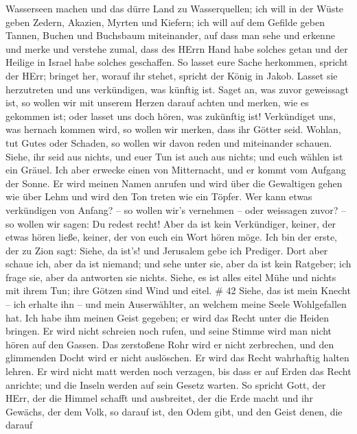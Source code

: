 Wasserseen machen und das dürre Land zu Wasserquellen;  ich
will in der Wüste geben Zedern, Akazien, Myrten und Kiefern; ich will
auf dem Gefilde geben Tannen, Buchen und Buchsbaum miteinander,
 auf dass man sehe und erkenne und merke und verstehe
zumal, dass des HErrn Hand habe solches getan und der Heilige in Israel
habe solches geschaffen.  So lasset eure Sache herkommen,
spricht der HErr; bringet her, worauf ihr stehet, spricht der König in
Jakob.  Lasset sie herzutreten und uns verkündigen, was
künftig ist. Saget an, was zuvor geweissagt ist, so wollen wir mit
unserem Herzen darauf achten und merken, wie es gekommen ist; oder
lasset uns doch hören, was zukünftig ist!  Verkündiget uns,
was hernach kommen wird, so wollen wir merken, dass ihr Götter seid.
Wohlan, tut Gutes oder Schaden, so wollen wir davon reden und
miteinander schauen.  Siehe, ihr seid aus nichts, und euer
Tun ist auch aus nichts; und euch wählen ist ein Gräuel. 
Ich aber erwecke einen von Mitternacht, und er kommt vom Aufgang der
Sonne. Er wird meinen Namen anrufen und wird über die Gewaltigen gehen
wie über Lehm und wird den Ton treten wie ein Töpfer.  Wer
kann etwas verkündigen von Anfang? -- so wollen wir's vernehmen -- oder
weissagen zuvor? -- so wollen wir sagen: Du redest recht! Aber da ist
kein Verkündiger, keiner, der etwas hören ließe, keiner, der von euch
ein Wort hören möge.  Ich bin der erste, der zu Zion sagt:
Siehe, da ist's! und Jerusalem gebe ich Prediger.  Dort
aber schaue ich, aber da ist niemand; und sehe unter sie, aber da ist
kein Ratgeber; ich frage sie, aber da antworten sie nichts.
 Siehe, es ist alles eitel Mühe und nichts mit ihrem Tun;
ihre Götzen sind Wind und eitel. \# 42  Siehe, das ist mein
Knecht -- ich erhalte ihn -- und mein Auserwählter, an welchem meine
Seele Wohlgefallen hat. Ich habe ihm meinen Geist gegeben; er wird das
Recht unter die Heiden bringen.  Er wird nicht schreien noch
rufen, und seine Stimme wird man nicht hören auf den Gassen.
 Das zerstoßene Rohr wird er nicht zerbrechen, und den
glimmenden Docht wird er nicht auslöschen. Er wird das Recht wahrhaftig
halten lehren.  Er wird nicht matt werden noch verzagen, bis
dass er auf Erden das Recht anrichte; und die Inseln werden auf sein
Gesetz warten.  So spricht Gott, der HErr, der die Himmel
schafft und ausbreitet, der die Erde macht und ihr Gewächs, der dem
Volk, so darauf ist, den Odem gibt, und den Geist denen, die darauf
